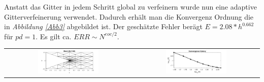 \documentclass[11pt,a4paper]{article}
\begin{document}
 Anstatt das Gitter in jedem Schritt global zu verfeinern wurde nun eine adaptive Gitterverfeinerung verwendet. Dadurch erhält man die Konvergenz Ordnung die in \textit{Abbildung \ref{Abb3}} abgebildet ist. Der geschätzte Fehler berägt $E=2.08*h^{0.662}$ für $pd=1$. Es gilt ca. $ERR \sim N^{eoc/2}$.

\begin{center}
  \begin{tabular}{cc}
  \includegraphics[width=0.5\textwidth]{Gitter3}&
  \includegraphics[width=0.5\textwidth]{EOC}
   \end{tabular}
  \label{Abb3}
  \end{center}
  
\end{document}
